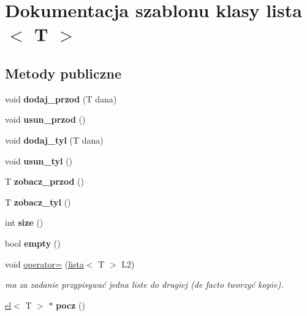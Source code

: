 \hypertarget{classlista}{\section{\-Dokumentacja szablonu klasy lista$<$ \-T $>$}
\label{classlista}
}
\subsection*{\-Metody publiczne}
\begin{DoxyCompactItemize}
\item 
\hypertarget{classlista_abfffecd8200714da1c80bb11b9aade5e}{void {\bfseries dodaj\-\_\-przod} (\-T dana)}\label{classlista_abfffecd8200714da1c80bb11b9aade5e}

\item 
\hypertarget{classlista_a6998ee006deb26a2e66d6b3df832a469}{void {\bfseries usun\-\_\-przod} ()}\label{classlista_a6998ee006deb26a2e66d6b3df832a469}

\item 
\hypertarget{classlista_ad35c120f3285b0a8a5069b540bc178ae}{void {\bfseries dodaj\-\_\-tyl} (\-T dana)}\label{classlista_ad35c120f3285b0a8a5069b540bc178ae}

\item 
\hypertarget{classlista_aa60cc53e042281898cead5bc99fd8fc8}{void {\bfseries usun\-\_\-tyl} ()}\label{classlista_aa60cc53e042281898cead5bc99fd8fc8}

\item 
\hypertarget{classlista_aae75ab30e8130ff72c409ac74588e778}{\-T {\bfseries zobacz\-\_\-przod} ()}\label{classlista_aae75ab30e8130ff72c409ac74588e778}

\item 
\hypertarget{classlista_aee86ec21992502a4cd67f8df38f37886}{\-T {\bfseries zobacz\-\_\-tyl} ()}\label{classlista_aee86ec21992502a4cd67f8df38f37886}

\item 
\hypertarget{classlista_a71ac53823aaa5f53d06de4d69910ef9a}{int {\bfseries size} ()}\label{classlista_a71ac53823aaa5f53d06de4d69910ef9a}

\item 
\hypertarget{classlista_a60113cb7fe7aa3bbf0e02e7bc5673adb}{bool {\bfseries empty} ()}\label{classlista_a60113cb7fe7aa3bbf0e02e7bc5673adb}

\item 
void \hyperlink{classlista_a34b6928b48bb770cf37ab65394385637}{operator=} (\hyperlink{classlista}{lista}$<$ \-T $>$ \-L2)
\begin{DoxyCompactList}\small\item\em ma za zadanie przypisywać jedna liste do drugiej (de facto tworzyć kopie). \end{DoxyCompactList}\item 
\hypertarget{classlista_af06eae49ae7e3923e2c7c9fbbd46867b}{\hyperlink{classel}{el}$<$ \-T $>$ $\ast$ {\bfseries pocz} ()}\label{classlista_af06eae49ae7e3923e2c7c9fbbd46867b}

\end{DoxyCompactItemize}
